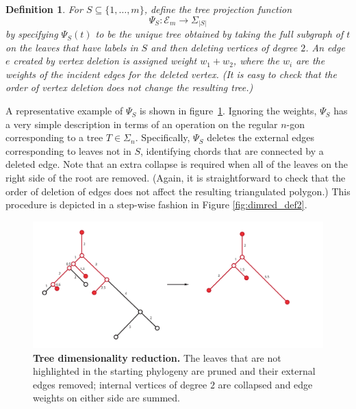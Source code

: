 \documentclass[a4paper,11pt]{article}
\newtheorem{definition}{Definition}
\newcommand{\aE}{\mathcal{E}}
\begin{document}
\begin{definition}
For $S \subseteq \{1,\ldots,m\}$, define the tree projection function 
\[
\Psi_S \colon \aE_m \to \Sigma_{|S|}
\] 
by specifying $\Psi_S(t)$ to be the unique tree obtained by taking the full subgraph of $t$ on the leaves that have labels in $S$ and then deleting vertices of degree $2$.
An edge $e$ created by vertex deletion is assigned weight $w_1 + w_2$, where the $w_i$ are the weights of the incident edges for the deleted vertex.
(It is easy to check that the order of vertex deletion does not change the resulting tree.)
\end{definition}

A representative example of $\Psi_S$ is shown in figure~\ref{fig:dimred_tree-dim-red}.
Ignoring the weights, $\Psi_S$ has a very simple description in terms of an operation on the regular $n$-gon corresponding to a tree $T \in \Sigma_n$.
Specifically, $\Psi_S$ deletes the external edges corresponding to leaves not in $S$, identifying chords that are connected by a deleted edge.
Note that an extra collapse is required when all of the leaves on the right side of the root are removed.
(Again, it is straightforward to check that the order of deletion of edges does not affect the resulting triangulated polygon.)
This procedure is depicted in a step-wise fashion in Figure \ref{fig:dimred_def2}.

\begin{figure}
    \centering
    \includegraphics[width=6in]{../figures/dimred_tree-dim-red.pdf}
    \caption{{\bf Tree dimensionality reduction.} The leaves that are not highlighted in the starting phylogeny are pruned and their external edges removed; internal vertices of degree $2$ are collapsed and edge weights on either side are summed.}
    \label{fig:dimred_tree-dim-red}
\end{figure} 
\end{document}
